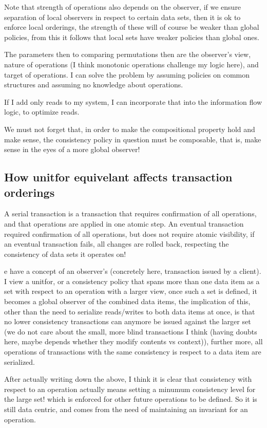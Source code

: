 Note that strength of operations also depends on the observer, if we ensure
separation of local observers in respect to certain data sets, then it is ok to
enforce local orderings, the strength of these will of course be weaker than
global policies, from this it follows that local sets have weaker policies than
global ones.

The parameters then to comparing permutations then are the observer's view,
nature of operations (I think monotonic operations challenge my logic here), and
target of operations. I can solve the problem by assuming policies on common
structures and assuming no knowledge about operations. 

If I add only reads to my system, I can incorporate that into the information flow logic,
to optimize reads. 

We must not forget that, in order to make the compositional property hold and
make sense, the consistency policy in question must be composable, that is, make
sense in the eyes of a more global observer!

\subsection{How unitfor equivelant affects transaction orderings}
A serial transaction is a transaction that requires confirmation of all
operations, and that operations are applied 
in one atomic step. An eventual transaction required confirmation of all
operations, but does not require atomic visibility, if an eventual transaction
fails, all changes are rolled back, respecting the consistency of data sets it
operates on! 

e have a concept of an observer's (concretely here, transaction issued by a
client). I view a unitfor, or a consistency policy that spans more than one data
item as a set with respect to an operation with a larger view, once such a set
is defined, it becomes a global observer of the combined data items, the
implication of this, other than the need to serialize reads/writes to both data
items at once, is that no lower consistency transactions can anymore be issued
against the larger set (we do not care about the small, more blind transactions
I think (having doubts here, maybe depends whether they modify contents vs
context)), further more, all operations of transactions with the same
consistency is respect to a data item are serialized. 

After actually writing down the above, I think it is clear that consistency with
respect to an operation actually means setting a minumum consistency level for
the large set! which is enforced for other future operations to be defined. So
it is still data centric, and comes from the need of maintaining an invariant
for an operation.

